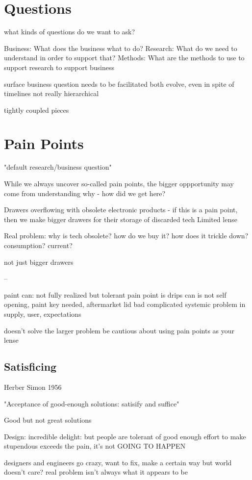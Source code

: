 \documentclass{article}
\begin{document}
\section{Questions}

what kinds of questions do we want to ask?

Business: What does the business what to do?
Research: What do we need to understand in order to support that?
Methods: What are the methods to use to support research to support business

surface business question
needs to be facilitated
both evolve, even in spite of timelines
not really hierarchical

tightly coupled pieces

\section{Pain Points}
"default research/business question"

While we always uncover so-called pain points, the bigger oppportunity may come from understanding why - how did we get here?

Drawers overflowing with obsolete electronic products - if this is a pain point, then we make bigger drawers for their storage of discarded tech
Limited lense

Real problem: why is tech obsolete? how do we buy it? how does it trickle down? consumption? current?

not just bigger drawers

--

paint can: not fully realized but tolerant
pain point is drips
can is not self opening, paint key needed, aftermarket lid bad
complicated systemic problem in supply, user, expectations

doesn't solve the larger problem
be cautious about using pain points as your lense

\subsection{Satisficing}
Herber Simon 1956

"Acceptance of good-enough solutions: satisify and suffice"

Good but not great solutions

Design: incredible delight: but people are tolerant of good enough
effort to make stupendous exceeds the pain, it's not GOING TO HAPPEN

designers and engineers go crazy, want to fix, make a certain way
but world doesn't care? real problem isn't always what it appears to be
\end{document}
